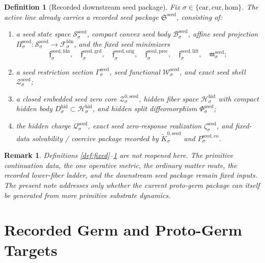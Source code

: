 \documentclass[11pt]{article}
\newcommand{\Car}{\mathrm{car}}
\newcommand{\Cur}{\mathrm{cur}}
\newcommand{\Hom}{\mathrm{hom}}
\newcommand{\FoundSpace}[1]{\mathcal F_{#1}^{\mathrm{fdn}}}
\newcommand{\HiddenSpace}[1]{\mathcal H_{#1}^{\mathrm{hid}}}
\newcommand{\HiddenBody}[1]{D_{#1}^{\mathrm{hid}}}
\newcommand{\SeedPackage}{\mathfrak S^{\mathrm{seed}}}
\newcommand{\SeedSpace}[1]{\mathcal S_{#1}^{\mathrm{seed}}}
\newcommand{\SeedBody}[1]{\mathcal B_{#1}^{\mathrm{seed}}}
\newcommand{\SeedProj}[1]{\Pi_{#1}^{\mathrm{seed}}}
\newcommand{\SeedFoundMin}[1]{\mathfrak f_{#1}^{\mathrm{seed,fdn}}}
\newcommand{\SeedGroundMin}[1]{\mathfrak f_{#1}^{\mathrm{seed,grd}}}
\newcommand{\SeedOrigMin}[1]{\mathfrak f_{#1}^{\mathrm{seed,orig}}}
\newcommand{\SeedPrecMin}[1]{\mathfrak f_{#1}^{\mathrm{seed,prec}}}
\newcommand{\SeedLiftMin}[1]{\mathfrak f_{#1}^{\mathrm{seed,lift}}}
\newcommand{\SeedSubMin}[1]{\mathfrak m_{#1}^{\mathrm{seed}}}
\newcommand{\SeedSection}[1]{\Gamma_{#1}^{\mathrm{seed}}}
\newcommand{\SeedFunctional}[1]{\mathscr W_{#1}^{\mathrm{seed}}}
\newcommand{\SeedShellSet}[1]{\mathcal Z_{#1}^{\mathrm{seed}}}
\newcommand{\SeedZeroCore}[1]{\mathcal Z_{#1}^{0,\mathrm{seed}}}
\newcommand{\SeedSplit}[1]{\Phi_{#1}^{\mathrm{seed}}}
\newcommand{\SeedCharge}[1]{\mathcal Q_{#1}^{\mathrm{seed}}}
\newcommand{\SeedEmbed}[1]{\zeta_{#1}^{\mathrm{seed}}}
\newcommand{\SeedKernelCh}[1]{\widetilde K_{#1}^{0,\mathrm{seed}}}
\newcommand{\SeedStateComp}[1]{P_{#1}^{\mathrm{seed,co}}}
\newtheorem{definition}{Definition}
\newtheorem{remark}{Remark}
\begin{document}
\begin{definition}[Recorded downstream seed package]
\label{def:seed}
Fix \(\sigma\in\{\Car,\Cur,\Hom\}\). The active line already carries a recorded seed package \(\SeedPackage\), consisting of:
\begin{enumerate}
    \item a seed state space \(\SeedSpace{\sigma}\), compact convex seed body \(\SeedBody{\sigma}\), affine seed projection \(\SeedProj{\sigma}:\SeedSpace{\sigma}\to\FoundSpace{\sigma}\), and the fixed seed minimizers
    \[
    \SeedFoundMin{\sigma},\quad
    \SeedGroundMin{\sigma},\quad
    \SeedOrigMin{\sigma},\quad
    \SeedPrecMin{\sigma},\quad
    \SeedLiftMin{\sigma},\quad
    \SeedSubMin{\sigma};
    \]
    \item a seed restriction section \(\SeedSection{\sigma}\), seed functional \(\SeedFunctional{\sigma}\), and exact seed shell \(\SeedShellSet{\sigma}\);
    \item a closed embedded seed zero core \(\SeedZeroCore{\sigma}\), hidden fiber space \(\HiddenSpace{\sigma}\) with compact hidden body \(\HiddenBody{\sigma}\subset\HiddenSpace{\sigma}\), and hidden split diffeomorphism \(\SeedSplit{\sigma}\);
    \item the hidden charge \(\SeedCharge{\sigma}\), exact seed zero-response realization \(\SeedEmbed{\sigma}\), and fixed-data solvability / coercive package recorded by \(\SeedKernelCh{\sigma}\) and \(\SeedStateComp{\sigma}\).
\end{enumerate}
\end{definition}

\begin{remark}
Definitions \ref{def:fixed}--\ref{def:seed} are not reopened here. The primitive continuation data, the one operative metric, the ordinary matter route, the recorded lower-fiber ladder, and the downstream seed package remain fixed inputs. The present note addresses only whether the current proto-germ package can itself be generated from more primitive substrate dynamics.
\end{remark}

\section{Recorded Germ and Proto-Germ Targets}
\end{document}
